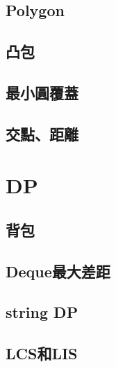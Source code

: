     \subsection{Polygon}
        \subsection{凸包}
        
        \subsection{最小圓覆蓋}
        
        \subsection{交點、距離}
            

\section{DP}
    \subsection{背包}
    \subsection{Deque最大差距}
    \subsection{string DP}
        
    \subsection{LCS和LIS}

